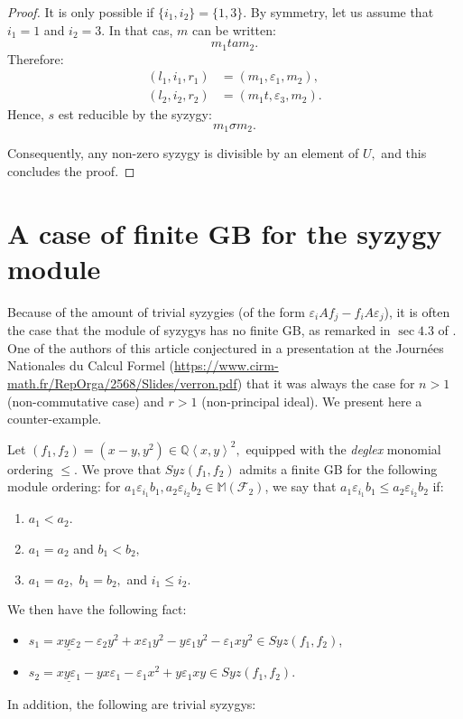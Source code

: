 \documentclass[sigconf]{acmart}
\theoremstyle{plain}
\theoremstyle{definition}
\theoremstyle{remark}
\newcommand{\MM}{\mathbb M}
\begin{document}
\begin{proof}
	It is only possible if $\{i_1, i_2\} = \{1, 3\}$.
	By symmetry, let us
	assume that $i_1 = 1$ and $i_2 = 3$. In that cas,
	 $m$ can be written:
	$$m_1 ta m_2.$$
	Therefore:
	\begin{align*}
		(l_1, i_1, r_1) &= (m_1, \varepsilon_1, m_2), \\
		(l_2, i_2, r_2) &= (m_1 t, \varepsilon_3, m_2).
	\end{align*}
	Hence, $s$ est reducible by the syzygy:
	$$m_1 \sigma m_2.$$
	
	Consequently, any non-zero syzygy is divisible
	by an element of $U,$
	and this concludes the proof.
\end{proof}

\section{A case of finite GB for the syzygy module}

Because of the amount of 
trivial syzygies (of the form $\varepsilon_i A f_j-f_i A \varepsilon_j$),
it is often the case that the module of syzygys
has no finite GB, as remarked 
in $\sec 4.3$ of \cite{HV21}. 
One of the authors of this article 
conjectured in a presentation at the 
Journées Nationales du Calcul Formel
(\url{https://www.cirm-math.fr/RepOrga/2568/Slides/verron.pdf})
that it was always the case for $n>1$
(non-commutative case) and $r>1$ (non-principal ideal).
We present here a counter-example.


Let $(f_1,f_2)=(x-y,y^2) \in \mathbb{Q} \left\langle x,y \right\rangle^2,$
equipped with the \textit{deglex} monomial ordering $\leq.$
We prove that $Syz(f_1,f_2)$ admits a finite GB 
for the following module ordering: for $a_1 \varepsilon_{i_1} b_1, a_2 \varepsilon_{i_2} b_2 \in \MM \left( \mathscr{F}_2 \right)$, we say that  $a_1 \varepsilon_{i_1} b_1 \leq a_2 \varepsilon_{i_2} b_2$ if:
\begin{enumerate}
\item $a_1<a_2$.
\item $a_1=a_2$ and $b_1 < b_2,$
\item $a_1=a_2,$ $b_1 = b_2,$ and $i_1 \leq i_2.$
\end{enumerate}

We then have the following fact:
\begin{itemize}
\item $s_1=\underline{xy \varepsilon_2}-\varepsilon_2 y^2+ x \varepsilon_1 y^2-y \varepsilon_1 y^2- \varepsilon_1 x y^2 \in Syz(f_1,f_2)$,
\item $s_2=\underline{xy \varepsilon_1}-yx\varepsilon_1 -  \varepsilon_1 x^2+y \varepsilon_1 xy \in Syz(f_1,f_2)$.
\end{itemize}
In addition, the following are trivial syzygys:
\end{document}
